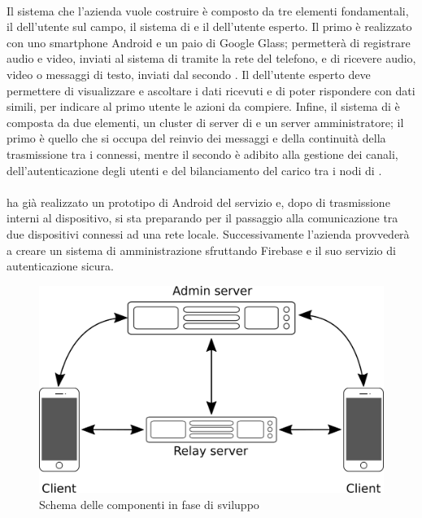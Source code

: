    \paragraph*{} Il sistema che l'azienda vuole costruire è composto da tre elementi fondamentali, il  dell'utente sul campo, il sistema di  e il  dell'utente esperto. Il primo è realizzato con uno smartphone Android e un paio di Google Glass; permetterà di registrare audio e video, inviati al sistema di  tramite la rete del telefono, e di ricevere audio, video o messaggi di testo, inviati dal secondo . Il  dell'utente esperto deve permettere di visualizzare e ascoltare i dati ricevuti e di poter rispondere con dati simili, per indicare al primo utente le azioni da compiere. Infine, il sistema di  è composta da due elementi, un cluster di server di  e un server amministratore; il primo è quello che si occupa del reinvio dei messaggi e della continuità della trasmissione tra i  connessi, mentre il secondo è adibito alla gestione dei canali, dell'autenticazione degli utenti e del bilanciamento del carico tra i nodi di .
   \paragraph*{}
   \nomeAzienda{} ha già realizzato un prototipo di  Android del servizio e, dopo  di trasmissione interni al dispositivo, si sta preparando per il passaggio alla comunicazione tra due dispositivi connessi ad una rete locale. Successivamente l'azienda provvederà a creare un sistema di amministrazione sfruttando Firebase e il suo servizio di autenticazione sicura.
   \begin{figure}[H]
      \begin{center}
         \includegraphics[width=12cm,keepaspectratio]{immagini/erastreaming-schema-attuale}
         \caption{Schema delle componenti in fase di sviluppo}
      \end{center}
   \end{figure}
